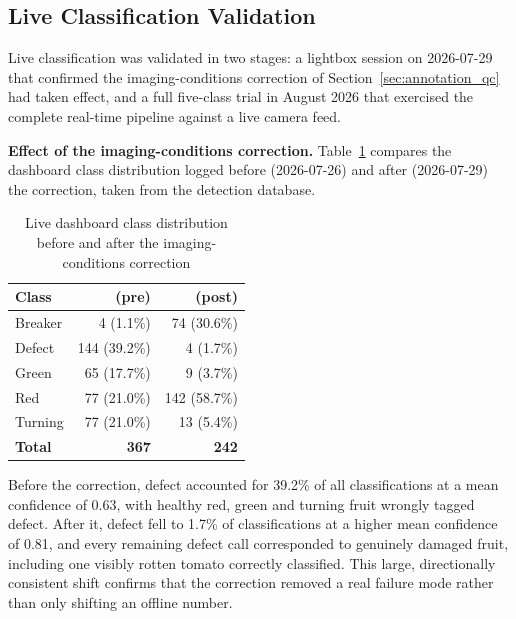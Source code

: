\subsection{Live Classification Validation}
\label{sec:r_live}

Live classification was validated in two stages: a lightbox session on 2026-07-29 that confirmed the imaging-conditions correction of Section~\ref{sec:annotation_qc} had taken effect, and a full five-class trial in August 2026 that exercised the complete real-time pipeline against a live camera feed.

\textbf{Effect of the imaging-conditions correction.} Table~\ref{tab:liveclass} compares the dashboard class distribution logged before (2026-07-26) and after (2026-07-29) the correction, taken from the detection database.

\begin{table}[H]
\caption{Live dashboard class distribution before and after the imaging-conditions correction}
\label{tab:liveclass}
\centering
\begin{tabular}{lrr}
\toprule
\textbf{Class} & \textbf{(pre)} & \textbf{(post)} \\
\midrule
Breaker & 4 (1.1\%)   & 74 (30.6\%) \\
Defect  & 144 (39.2\%) & 4 (1.7\%) \\
Green   & 65 (17.7\%)  & 9 (3.7\%) \\
Red     & 77 (21.0\%)  & 142 (58.7\%) \\
Turning & 77 (21.0\%)  & 13 (5.4\%) \\
\midrule
\textbf{Total} & \textbf{367} & \textbf{242} \\
\bottomrule
\end{tabular}
\end{table}

Before the correction, defect accounted for 39.2\% of all classifications at a mean confidence of 0.63, with healthy red, green and turning fruit wrongly tagged defect. After it, defect fell to 1.7\% of classifications at a higher mean confidence of 0.81, and every remaining defect call corresponded to genuinely damaged fruit, including one visibly rotten tomato correctly classified. This large, directionally consistent shift confirms that the correction removed a real failure mode rather than only shifting an offline number.

